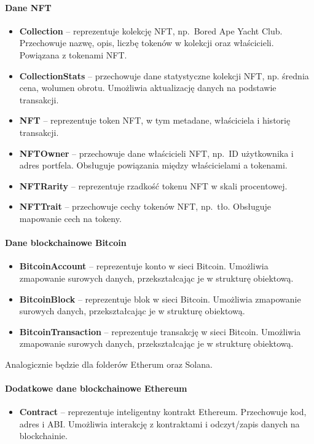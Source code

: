 \paragraph{Dane NFT}
\begin{itemize}
\item \textbf{Collection} -- reprezentuje kolekcję NFT, np.\ Bored Ape Yacht Club. Przechowuje nazwę, opis, liczbę tokenów w kolekcji oraz właścicieli. Powiązana z tokenami NFT.
\item \textbf{CollectionStats} -- przechowuje dane statystyczne kolekcji NFT, np. średnia cena, wolumen obrotu. Umożliwia aktualizację danych na podstawie transakcji.
\item \textbf{NFT} -- reprezentuje token NFT, w tym metadane, właściciela i historię transakcji.
\item \textbf{NFTOwner} -- przechowuje dane właścicieli NFT, np.\ ID użytkownika i adres portfela. Obsługuje powiązania między właścicielami a tokenami.
\item \textbf{NFTRarity} -- reprezentuje rzadkość tokenu NFT w skali procentowej.
\item \textbf{NFTTrait} -- przechowuje cechy tokenów NFT, np.\ tło. Obsługuje mapowanie cech na tokeny.
\end{itemize}

\paragraph{Dane blockchainowe Bitcoin}
\begin{itemize}
\item \textbf{BitcoinAccount} -- reprezentuje konto w sieci Bitcoin. Umożliwia zmapowanie surowych danych, przekształcając je w strukturę obiektową.
\item \textbf{BitcoinBlock} -- reprezentuje blok w sieci Bitcoin. Umożliwia zmapowanie surowych danych, przekształcając je w strukturę obiektową.
\item \textbf{BitcoinTransaction} -- reprezentuje transakcję w sieci Bitcoin. Umożliwia zmapowanie surowych danych, przekształcając je w strukturę obiektową.
\end{itemize}

\noindent Analogicznie będzie dla folderów Etherum oraz Solana.\\[-20pt]
\paragraph{Dodatkowe dane blockchainowe Ethereum}
\begin{itemize}
\item \textbf{Contract} -- reprezentuje inteligentny kontrakt Ethereum. Przechowuje kod, adres i ABI. Umożliwia interakcję z kontraktami i odczyt/zapis danych na blockchainie.
\end{itemize}


